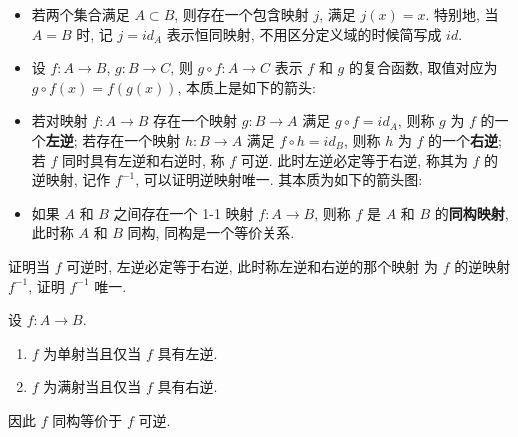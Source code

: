 \documentclass[UTF8]{book}
\begin{document}
\begin{definition}
\begin{itemize}
        \item 若两个集合满足 $A\subset B$, 
        则存在一个包含映射 $j$, 满足 $j(x) = x$. 
        特别地, 当 $A=B$ 时, 记 $j=id_A$ 表示恒同映射, 
        不用区分定义域的时候简写成 $id$. 

        \item 设 $f:A\to B$, $g:B\to C$, 
        则 $g\circ f: A \to C$ 表示 $f$ 和 $g$ 的复合函数, 
        取值对应为 $g\circ f(x) = f(g(x))$, 
        本质上是如下的箭头: 
        \begin{center}
        \end{center}

        \item 若对映射 $f:A\to B$ 存在一个映射 
        $g:B\to A$ 满足 $g\circ f = id_A$, 
        则称 $g$ 为 $f$ 的一个\textbf{左逆}; 
        若存在一个映射 
        $h:B\to A$ 满足 $f\circ h = id_B$, 
        则称 $h$ 为 $f$ 的一个\textbf{右逆}; 
        若 $f$ 同时具有左逆和右逆时, 称 $f$ 可逆. 
        此时左逆必定等于右逆, 称其为 $f$ 的逆映射, 记作 $f^{-1}$, 
        可以证明逆映射唯一. 其本质为如下的箭头图: 
        \begin{center}
        \end{center}

        \item 如果 $A$ 和 $B$ 之间存在一个 1-1 映射 $f:A\to B$, 
        则称 $f$ 是 $A$ 和 $B$ 的\textbf{同构映射}, 
        此时称 $A$ 和 $B$ 同构, 同构是一个等价关系. 
    \end{itemize}
\end{definition}

\begin{exercise}
    证明当 $f$ 可逆时, 左逆必定等于右逆, 此时称左逆和右逆的那个映射
    为 $f$ 的逆映射 $f^{-1}$, 证明 $f^{-1}$ 唯一. 
\end{exercise}

\begin{proposition}
    设 $f:A\to B$. 
    \begin{enumerate}[(1)]
        \item $f$ 为单射当且仅当 $f$ 具有左逆. 
        \item $f$ 为满射当且仅当 $f$ 具有右逆. 
    \end{enumerate}
    因此 $f$ 同构等价于 $f$ 可逆. 
\end{proposition}
\end{document}
